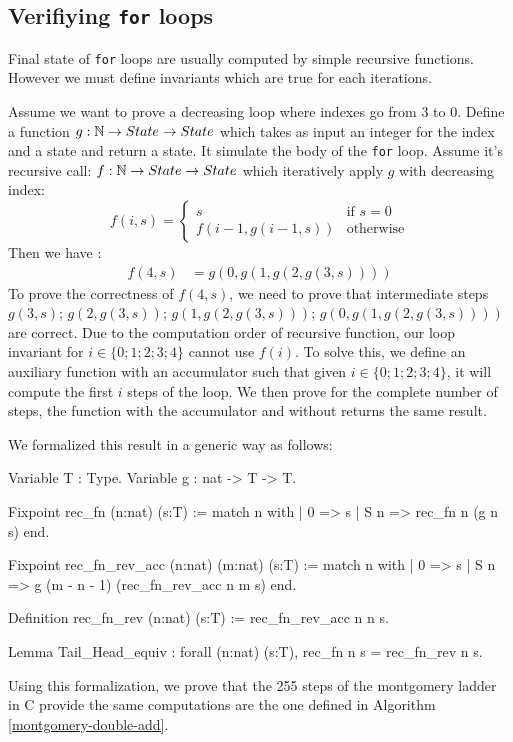\subsection{Verifiying \texttt{for} loops}

Final state of \texttt{for} loops are usually computed by simple recursive functions.
However we must define invariants which are true for each iterations.

Assume we want to prove a decreasing loop where indexes go from 3 to 0.
Define a function $g : \mathbb{N} \rightarrow State  \rightarrow State $ which takes as input an integer for the index and a state and return a state.
It simulate the body of the \texttt{for} loop.
Assume it's recursive call: $f : \mathbb{N} \rightarrow State \rightarrow State $ which iteratively apply $g$ with decreasing index:
\begin{equation*}
  f ( i , s ) =
  \begin{cases}
  s & \text{if } s = 0 \\
  f( i - 1 , g ( i - 1  , s )) & \text{otherwise}
  \end{cases}
\end{equation*}
Then we have :
\begin{align*}
  f(4,s) &= g(0,g(1,g(2,g(3,s))))
\end{align*}
To prove the correctness of $f(4,s)$, we need to prove that intermediate steps
$g(3,s)$; $g(2,g(3,s))$; $g(1,g(2,g(3,s)))$; $g(0,g(1,g(2,g(3,s))))$ are correct.
Due to the computation order of recursive function, our loop invariant for $i\in\{0;1;2;3;4\}$ cannot use $f(i)$.
To solve this, we define an auxiliary function with an accumulator such that given $i\in\{0;1;2;3;4\}$, it will compute the first $i$ steps of the loop.
We then prove for the complete number of steps, the function with the accumulator and without returns the same result.

We formalized this result in a generic way as follows:
\begin{Coq}
Variable T : Type.
Variable g : nat -> T -> T.

Fixpoint rec_fn (n:nat) (s:T) :=
  match n with
  | 0 => s
  | S n => rec_fn n (g n s)
  end.

Fixpoint rec_fn_rev_acc (n:nat) (m:nat) (s:T) :=
  match n with
  | 0 => s
  | S n => g (m - n - 1) (rec_fn_rev_acc n m s)
  end.

Definition rec_fn_rev (n:nat) (s:T) :=
  rec_fn_rev_acc n n s.

Lemma Tail_Head_equiv :
  forall (n:nat) (s:T),
  rec_fn n s = rec_fn_rev n s.
\end{Coq}
Using this formalization, we prove that the 255 steps of the montgomery ladder in C provide the same computations are the one defined in Algorithm \ref{montgomery-double-add}.
